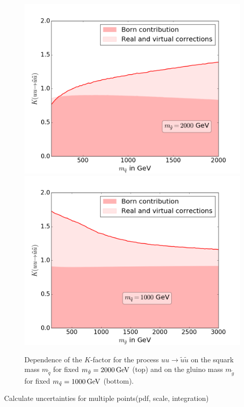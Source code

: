 \begin{figure}[!htpb]
\begin{center}
\includegraphics[scale=.5]{figures/MRSSM_uu_susu_Kfactors_msg=2000GeV.png}
\includegraphics[scale=.5]{figures/MRSSM_uu_susu_Kfactors_msq=1000GeV.png}
\caption{Dependence of the $K$-factor for the process $uu \to \tilde{u}\tilde{u}$ on the squark mass $m_{\tilde{q}}$ for fixed $m_{\tilde{g}} = \unit[2000]{GeV}$ (top) and on the gluino mass $m_{\tilde{g}}$ for fixed $m_{\tilde{q}} = \unit[1000]{GeV}$ (bottom).}\label{fig:1LXsection_fixed_m}
\end{center}
\end{figure}
Calculate uncertainties for multiple points(pdf, scale, integration)


